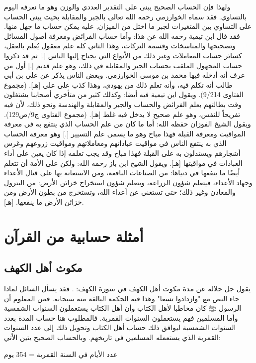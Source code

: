 ولهذا فإن الحساب الصحيح يبنى على التقدير العددي والوزن وهو ما نعرفه اليوم بالتساوي. فقد سماه الخوارزمي رحمه الله تعالى بالجبر والمقابلة بحيث يبنى الحساب على التساوي بين المتغيرات لجبر ما اختل من الميزان, عليه يمكن حساب ما جهل منها. فقد قال ابن تيمية رحمه الله عن هذا:
وأما حساب الفرائض ومعرفة أصول المسائل وتصحيحها والمناسخات وقسمة التركات، وهذا الثاني كله علم معقول يُعلم بالعقل، كسائر حساب المعاملات وغير ذلك من الأنواع التي يحتاج إليها الناس [.] ثم قد ذكروا حساب المجهول الملقب بحساب الجبر والمقابلة في ذلك، وهو علم قديم [.] أول من عرف أنه أدخله فيها محمد بن موسى الخوارزمي. وبعض الناس يذكر عن علي بن أبي طالب أنه تكلم فيه، وأنه تعلم ذلك من يهودي، وهذا كذب على علي
[هـ].
{\footnotesize (مجموع الفتاوى 9/214)}.
ويقول اين تيمية فيه أيضا:
وكذلك كثير من متأخري أصحابنا يشتغلون وقت بطالتهم بعلم الفرائض والحساب والجبر والمقابلة والهندسة ونحو ذلك، لأن فيه تفريحاً للنفس، وهو علم صحيح لا يدخل فيه غلط
[هـ].
{\footnotesize (مجموع الفتاوى ج9/ص129)}.
ويقول الشيخ الفوزان حفظه الله:
أما ما كان من علم الحساب الذي ينتفع به في معرفة المواقيت ومعرفة القبلة فهذا مباح وهو ما يسمى علم التسيير [.] وهو معرفة الحساب الذي به ينتفع الناس في مواقيت عباداتهم ومعاملاتهم ومواقيت زروعهم وغرس أشجارهم ويستدلون به على القبلة فهذا مباح وقد يجب تعلمه إذا كان يعين على أداء العبادات في مواقيتها [هـ].
ويقول الشيخ ابن باز رحمه الله:
ولكن على الأمة أن تتعلم أيضًا ما ينفعها في دنياها: من الصناعات النافعة، ومن الاستعانة بها على قتال الأعداء وجهاد الأعداء، فيتعلم شؤون الزراعة، ويتعلم شؤون استخراج خزائن الأرض: من البترول والمعادن وغير ذلك؛ حتى تستغني عن أعداء الله، وتستخرج من بطون الأرض ومن خزائن الأرض ما ينفعها.
[هـ].

\section{أمثلة حسابية من القرآن}
\subsection{مكوث أهل الكهف}
يقول جل جلاله عن مدة مكوث أهل الكهف في سورة الكهف:
\quranayah*[18][25]{\footnotesize \surahname*[18]}. فقد يسأل السائل لماذا جاء النص مع "وازدادوا تسعا" وهذا فيه الحكمة البالغة منه سبحانه. فمن المعلوم أن الرسول ﷺ كان مخاطبا لأهل الكتاب وأن أهل الكتاب يستعملون السنوات الشمسية وأما المسلمين فهم يستعملون السنوات القمرية. فالمطلوب هنا حساب المدة بعدد السنوات الشمسية ليوافق ذلك حساب أهل الكتاب وتحويل ذلك إلى عدد السنوات القمرية الذي يستعمله المسلمين في تاريخهم. وبالحساب الصحيح يتين الأتي:

عدد الأيام في السنة القمرية = 354 يوم

